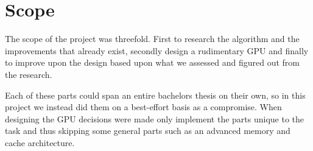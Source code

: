 	\section{Scope}
		
		The scope of the project was threefold. First to research the algorithm
		and the improvements that already exist, secondly design a rudimentary 
		GPU and	finally to improve upon the design based upon what we assessed 
		and	figured out from the research.

		Each of these parts could span an entire bachelors thesis on their own, 
		so in this project we instead did them on a best-effort basis as a 
		compromise.	When designing the GPU decisions were made only implement 
		the parts unique to the task and thus skipping some general parts such 
		as an advanced memory and cache architecture.

